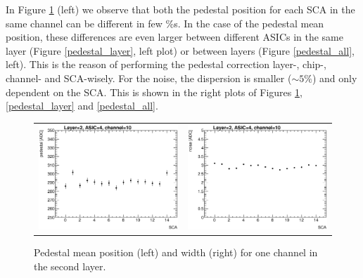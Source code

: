 \documentclass[a4paper,11pt]{article}
\begin{document}
In Figure \ref{pedestal_channel} (left) we observe that both the pedestal position for each SCA in the same channel can be
different in few \%s. In the case of the pedestal mean position, these differences are even larger between different ASICs in the same
layer (Figure \ref{pedestal_layer}, left plot) or between layers (Figure \ref{pedestal_all}, left). This is the reason of
performing the pedestal correction layer-, chip-, channel- and SCA-wisely.
For the noise, the dispersion is smaller ($\sim 5 \%$) and only dependent on the SCA. This is shown in the right plots of Figures \ref{pedestal_channel}, \ref{pedestal_layer} and \ref{pedestal_all}.

\begin{figure}[!t]
  \centering
  \begin{tabular}{ll}
    \includegraphics[width=2.8in]{figs/pedestal/ped_mean_layer2_chip4_cell10.eps} & \includegraphics[width=2.8in]{figs/pedestal/ped_width_layer2_chip4_cell10.eps}
  \end{tabular}
  \caption{Pedestal mean position (left) and width (right) for one channel in the second layer.}
\label{pedestal_channel}
\end{figure}
\end{document}
